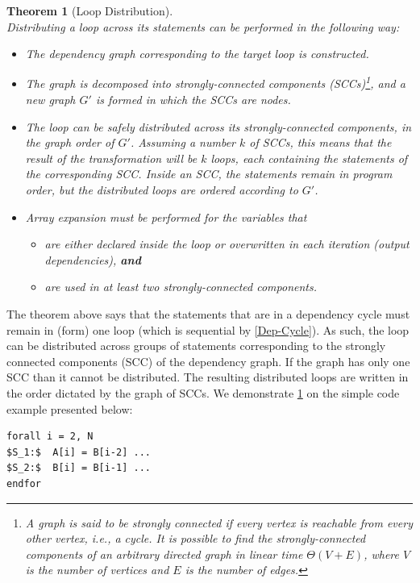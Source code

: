 \documentclass[acmsmall,review]{acmart}\settopmatter{printfolios=true,printccs=false,printacmref=false}
\newtheorem{mytheo}{Theorem}
\begin{document}
\begin{mytheo}[Loop Distribution]\label{Loop-Distrib}
$\mbox{ }$\\
Distributing a loop across its statements can be performed
in the following way:
\begin{itemize}
    \item[1.] The dependency graph corresponding to the target loop
        is constructed.
    \item[2.] The graph is decomposed into strongly-connected components 
            (SCCs)\footnote{
            A graph is said to be strongly connected if every vertex 
            is reachable from every other vertex, i.e., a cycle.
            It is possible to find the strongly-connected components
            of an arbitrary directed graph in linear time $\Theta(V+E)$,
            where $V$ is the number of vertices and $E$ is the number of
            edges.
        }, and a new graph $G'$ is formed in which the SCCs are nodes. 
    \item[3.] The loop can be safely distributed across its strongly-connected
        components, in the graph order of $G'$.
        Assuming a number $k$ of SCCs, this means that the result of the
        transformation will be $k$ loops, each containing the statements
        of the corresponding SCC. Inside an SCC, the statements remain in
        program order, but the distributed loops are ordered according to
        $G'$. 
    \item[4.] Array expansion must be performed for the variables that
        \begin{itemize}
            \item are either declared inside the loop or overwritten
                in each iteration (output dependencies), \textbf{\em and}
            \item are used in at least two strongly-connected components.
        \end{itemize} 
\end{itemize}
\end{mytheo}

The theorem above says that the statements that are in a dependency 
cycle must remain in (form) one loop (which is sequential by 
\cref{Dep-Cycle}). As such, the loop can be distributed across
groups of statements corresponding to the strongly connected 
components (SCC) of the dependency graph. If the graph has only one
SCC than it cannot be distributed.  The resulting distributed loops
are written in the order dictated by the graph of SCCs. 
%
We demonstrate \cref{Loop-Distrib} on the simple code example presented 
below:
\begin{lstlisting}[mathescape=true]
forall i = 2, N
$S_1:$  A[i] = B[i-2] ...
$S_2:$  B[i] = B[i-1] ...
endfor
\end{lstlisting}\vspace{-2ex}
\end{document}
